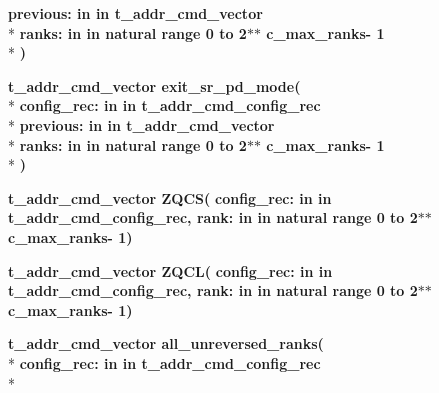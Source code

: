 \begin{DoxyCompactItemize}
{\bfseries \textcolor{vhdlchar}{previous\+: }\textcolor{stringliteral}{in }\textcolor{vhdlchar}{in t\+\_\+addr\+\_\+cmd\+\_\+vector}}\\*
{\bfseries \textcolor{vhdlchar}{ranks\+: }\textcolor{stringliteral}{in }\textcolor{vhdlchar}{in natural   range  0 to  2$\ast$$\ast$   c\+\_\+max\+\_\+ranks-\/ 1}}\\*
{\bfseries  )} 
\item 
{\bfseries {\bfseries {\bfseries {\bf t\+\_\+addr\+\_\+cmd\+\_\+vector}} \textcolor{vhdlchar}{ }}} {\bf exit\+\_\+sr\+\_\+pd\+\_\+mode}{\bfseries  ( }\\*
{\bfseries \textcolor{vhdlchar}{config\+\_\+rec\+: }\textcolor{stringliteral}{in }\textcolor{vhdlchar}{in t\+\_\+addr\+\_\+cmd\+\_\+config\+\_\+rec}}\\*
{\bfseries \textcolor{vhdlchar}{previous\+: }\textcolor{stringliteral}{in }\textcolor{vhdlchar}{in t\+\_\+addr\+\_\+cmd\+\_\+vector}}\\*
{\bfseries \textcolor{vhdlchar}{ranks\+: }\textcolor{stringliteral}{in }\textcolor{vhdlchar}{in natural   range  0 to  2$\ast$$\ast$   c\+\_\+max\+\_\+ranks-\/ 1}}\\*
{\bfseries  )} 
\item 
{\bfseries {\bfseries {\bfseries {\bf t\+\_\+addr\+\_\+cmd\+\_\+vector}} \textcolor{vhdlchar}{ }}} {\bf Z\+Q\+CS}{\bfseries  ( }{\bfseries \textcolor{vhdlchar}{config\+\_\+rec\+: }\textcolor{stringliteral}{in }\textcolor{vhdlchar}{in t\+\_\+addr\+\_\+cmd\+\_\+config\+\_\+rec}}{\bfseries  , \textcolor{vhdlchar}{rank\+: }\textcolor{stringliteral}{in }\textcolor{vhdlchar}{in natural   range  0 to  2$\ast$$\ast$   c\+\_\+max\+\_\+ranks-\/ 1}}{\bfseries  )} 
\item 
{\bfseries {\bfseries {\bfseries {\bf t\+\_\+addr\+\_\+cmd\+\_\+vector}} \textcolor{vhdlchar}{ }}} {\bf Z\+Q\+CL}{\bfseries  ( }{\bfseries \textcolor{vhdlchar}{config\+\_\+rec\+: }\textcolor{stringliteral}{in }\textcolor{vhdlchar}{in t\+\_\+addr\+\_\+cmd\+\_\+config\+\_\+rec}}{\bfseries  , \textcolor{vhdlchar}{rank\+: }\textcolor{stringliteral}{in }\textcolor{vhdlchar}{in natural   range  0 to  2$\ast$$\ast$   c\+\_\+max\+\_\+ranks-\/ 1}}{\bfseries  )} 
\item 
{\bfseries {\bfseries {\bfseries {\bf t\+\_\+addr\+\_\+cmd\+\_\+vector}} \textcolor{vhdlchar}{ }}} {\bf all\+\_\+unreversed\+\_\+ranks}{\bfseries  ( }\\*
{\bfseries \textcolor{vhdlchar}{config\+\_\+rec\+: }\textcolor{stringliteral}{in }\textcolor{vhdlchar}{in t\+\_\+addr\+\_\+cmd\+\_\+config\+\_\+rec}}\\*

\end{DoxyCompactItemize}
